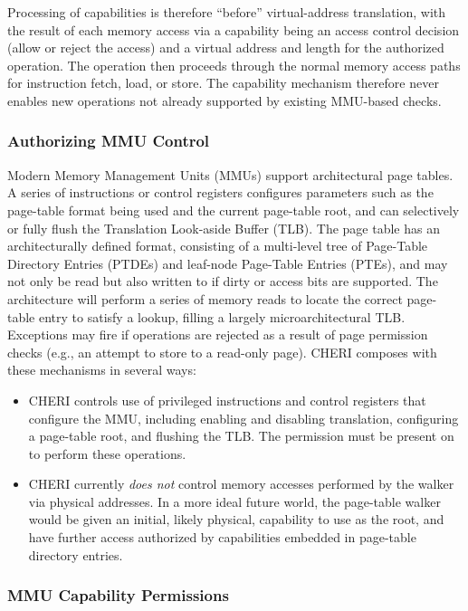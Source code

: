 Processing of capabilities is therefore ``before'' virtual-address
translation, with the result of each memory access via a capability being an
access control decision (allow or reject the access) and a virtual address and
length for the authorized operation.
The operation then proceeds through the normal memory access paths for
instruction fetch, load, or store.
The capability mechanism therefore never enables new operations not already
supported by existing MMU-based checks.

\subsubsection{Authorizing MMU Control}

Modern Memory Management Units (MMUs) support architectural page tables.
A series of instructions or control registers
configures parameters such as the page-table format being used and the current
page-table root, and can selectively or fully flush the Translation
Look-aside Buffer (TLB).
The page table has an architecturally defined format, consisting of a
multi-level tree of Page-Table Directory Entries (PTDEs) and leaf-node
Page-Table Entries (PTEs), and may not only be read but also written to if
dirty or access bits are supported.
The architecture will perform a series of memory reads to locate the correct
page-table entry to satisfy a lookup, filling a largely microarchitectural
TLB.
Exceptions may fire if operations are rejected as a result of
page permission checks (e.g., an attempt to store to a read-only page).
CHERI composes with these mechanisms in several ways:

\begin{itemize}
\item CHERI controls use of privileged instructions and control registers that
  configure the MMU, including enabling and disabling translation, configuring
  a page-table root, and flushing the TLB.
  The \cappermASR* permission must be present on \PCC{} to perform these
  operations.

\item CHERI currently
  \textit{does not} control memory accesses performed by the walker via
  physical addresses.
  In a more ideal future world, the page-table walker would be given an
  initial, likely physical, capability to use as the root, and have further
  access authorized by capabilities embedded in page-table directory entries.
\end{itemize}

\subsubsection{MMU Capability Permissions}

